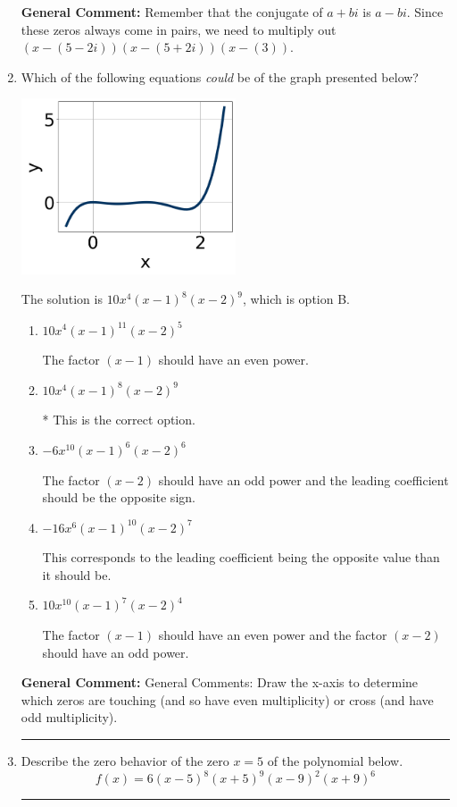 \documentclass{extbook}[14pt]
\newcommand{\litem}[1]{\item #1

\rule{\textwidth}{0.4pt}}
\begin{document}
\begin{enumerate}
{\textbf{General Comment:} Remember that the conjugate of $a+bi$ is $a-bi$. Since these zeros always come in pairs, we need to multiply out $(x-(5 - 2 i))(x-(5 + 2 i))(x-(3))$.
}
\litem{
Which of the following equations \textit{could} be of the graph presented below?

\begin{center}
    \includegraphics[width=0.5\textwidth]{../Figures/polyGraphToFunctionCopyC.png}
\end{center}




The solution is \( 10x^{4} (x - 1)^{8} (x - 2)^{9} \), which is option B.\begin{enumerate}[label=\Alph*.]
\item \( 10x^{4} (x - 1)^{11} (x - 2)^{5} \)

The factor $(x - 1)$ should have an even power.
\item \( 10x^{4} (x - 1)^{8} (x - 2)^{9} \)

* This is the correct option.
\item \( -6x^{10} (x - 1)^{6} (x - 2)^{6} \)

The factor $(x - 2)$ should have an odd power and the leading coefficient should be the opposite sign.
\item \( -16x^{6} (x - 1)^{10} (x - 2)^{7} \)

This corresponds to the leading coefficient being the opposite value than it should be.
\item \( 10x^{10} (x - 1)^{7} (x - 2)^{4} \)

The factor $(x - 1)$ should have an even power and the factor $(x - 2)$ should have an odd power.
\end{enumerate}

\textbf{General Comment:} General Comments: Draw the x-axis to determine which zeros are touching (and so have even multiplicity) or cross (and have odd multiplicity).
}
\litem{
Describe the zero behavior of the zero $x = 5$ of the polynomial below.
\[ f(x) = 6(x - 5)^{8}(x + 5)^{9}(x - 9)^{2}(x + 9)^{6} \]

}
\end{enumerate}
\end{document}
